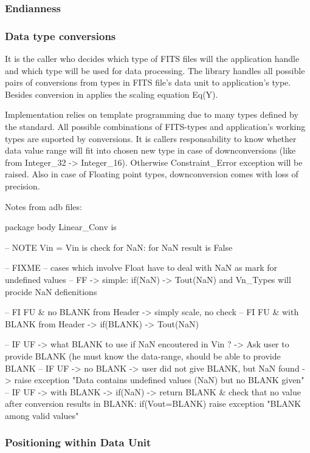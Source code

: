 \documentclass[a4paper,10pt]{article}
\begin{document}
\subsubsection{Endianness}

\subsubsection{Data type conversions}

It is the caller who decides which type of FITS files will the application handle and
which type will be used for data processing. The library handles all possible pairs of
conversions from types in FITS file's data unit to application's type.
Besides conversion in applies the scaling equation Eq(Y).

Implementation relies on template programming due to many types defined by the standard. 
All possible combinations of FITS-types and application's working types are suported
by conversions. It is callers responsability to know whether data value range will fit
into chosen new type in case of downconversions (like from Integer\_32 -> Integer\_16).
Otherwise Constraint\_Error exception will be raised.
Also in case of Floating point types, downconversion comes with loss of precision.

Notes from adb files:

package body Linear\_Conv is

-- NOTE Vin = Vin is check for NaN: for NaN result is False

-- FIXME
    -- cases which involve Float have to deal with NaN as mark for undefined values
    -- FF -> simple: if(NaN) -> Tout(NaN) and Vn\_Types will procide NaN defienitions

    -- FI FU \& no   BLANK from Header -> simply scale, no check
    -- FI FU \& with BLANK from Header -> if(BLANK) -> Tout(NaN)

    -- IF UF -> what BLANK to use if NaN encoutered in Vin ? -> Ask user to provide BLANK (he must know the data-range, should be able to provide BLANK
    -- IF UF -> no   BLANK -> user did not give BLANK, but NaN found -> raise exception "Data contains undefined values (NaN) but no BLANK given"
    -- IF UF -> with BLANK -> if(NaN) -> return BLANK \& check that no value after conversion results in BLANK: if(Vout=BLANK) raise exception "BLANK among valid values"





\subsubsection{Positioning within Data Unit}
\end{document}
